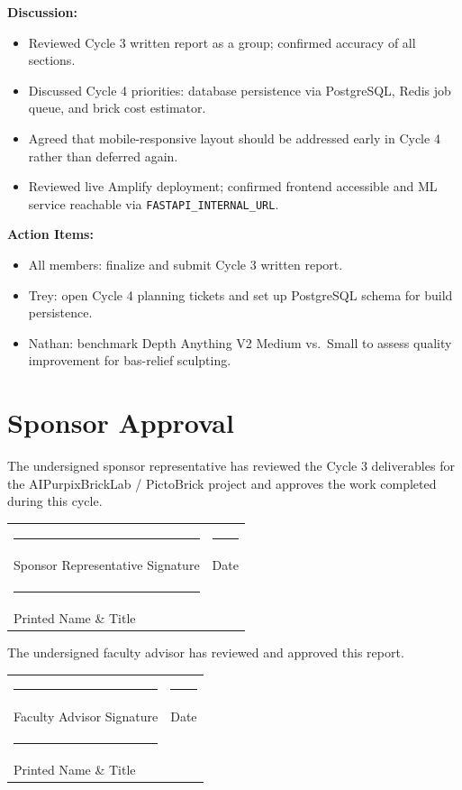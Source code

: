 \documentclass[12pt]{article}
\begin{document}
\textbf{Discussion:}
\begin{itemize}[leftmargin=*]
    \item Reviewed Cycle 3 written report as a group; confirmed accuracy of all sections.
    \item Discussed Cycle 4 priorities: database persistence via PostgreSQL, Redis job queue, and brick cost estimator.
    \item Agreed that mobile-responsive layout should be addressed early in Cycle 4 rather than deferred again.
    \item Reviewed live Amplify deployment; confirmed frontend accessible and ML service reachable via \texttt{FASTAPI\_INTERNAL\_URL}.
\end{itemize}

\textbf{Action Items:}
\begin{itemize}[leftmargin=*]
    \item All members: finalize and submit Cycle 3 written report.
    \item Trey: open Cycle 4 planning tickets and set up PostgreSQL schema for build persistence.
    \item Nathan: benchmark Depth Anything V2 Medium vs.\ Small to assess quality improvement for bas-relief sculpting.
\end{itemize}

\newpage
\section{Sponsor Approval}

The undersigned sponsor representative has reviewed the Cycle 3 deliverables
for the AIPurpixBrickLab / PictoBrick project and approves the work completed
during this cycle.

\vspace{2em}

\noindent
\begin{tabular}{p{7cm} p{5cm}}
\rule{6.5cm}{0.4pt} & \rule{4.5cm}{0.4pt} \\
Sponsor Representative Signature   & Date \\[2.5em]
\rule{6.5cm}{0.4pt} & \\
Printed Name \& Title              & \\
\end{tabular}

\vspace{3em}

\noindent
The undersigned faculty advisor has reviewed and approved this report.

\vspace{2em}

\noindent
\begin{tabular}{p{7cm} p{5cm}}
\rule{6.5cm}{0.4pt} & \rule{4.5cm}{0.4pt} \\
Faculty Advisor Signature          & Date \\[2.5em]
\rule{6.5cm}{0.4pt} & \\
Printed Name \& Title              & \\
\end{tabular}
\end{document}
